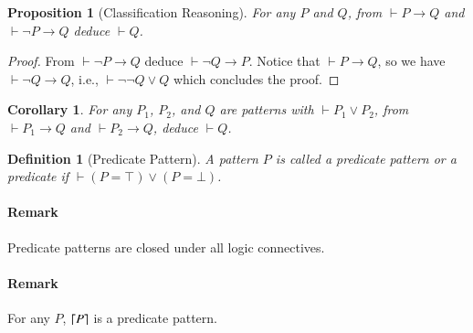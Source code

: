 \documentclass{article}
\theoremstyle{plain}
\newtheorem{prop}[thm]{Proposition}
\newtheorem{cor}[thm]{Corollary}
\newtheorem{defn}[thm]{Definition}
\DeclarePairedDelimiter\ceil{\lceil}{\rceil}
\begin{document}
\begin{prop}[Classification Reasoning] \label{prop:classificationreasoning}
	For any $P$ and $Q$, from $\vdash P \to Q$ and $\vdash \neg P \to Q$ deduce $\vdash Q$.
\end{prop}
\begin{proof}
	From $\vdash \neg P \to Q$ deduce $\vdash \neg Q \to P$. Notice that $\vdash P \to Q$, so we have $\vdash \neg Q \to Q$, i.e., $\vdash \neg \neg Q \vee Q$ which concludes the proof.
\end{proof}
\begin{cor} \label{cor:classificationreasoning}
	For any $P_1$, $P_2$, and $Q$ are patterns with $\vdash P_1 \vee P_2$, from $\vdash P_1 \to Q$ and $\vdash P_2 \to Q$, deduce $\vdash Q$.
\end{cor}

\begin{defn}[Predicate Pattern]
A pattern $P$ is called a predicate pattern or a predicate if $\vdash (P = \top) \vee (P = \bot)$.
\end{defn}
\paragraph{Remark} Predicate patterns are closed under all logic connectives.
\paragraph{Remark} For any $P$, $\ceil*{P}$ is a predicate pattern.
\end{document}
